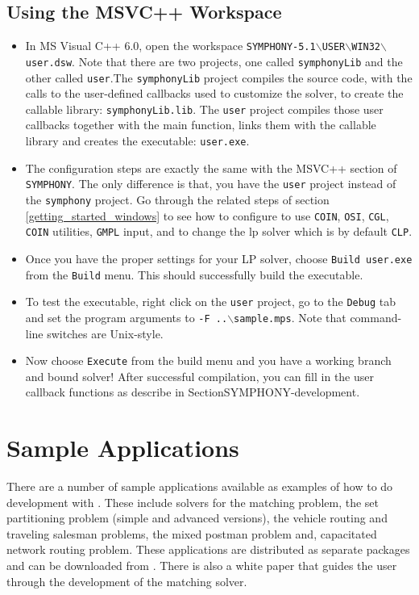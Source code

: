 \subsection{Using the MSVC++ Workspace}

\begin{itemize}
\item
In MS Visual C++ 6.0, open the workspace 
\texttt{SYMPHONY-5.1$\backslash$USER$\backslash$WIN32$\backslash$user.dsw}.
Note that there are two projects, one called \texttt{symphonyLib} and the other 
called \texttt{user}.The \texttt{symphonyLib} project compiles the source code, with the 
calls to the user-defined callbacks used to customize the solver, to create 
the callable library: \texttt{symphonyLib.lib}. The \texttt{user} 
project compiles those user callbacks together with the main function, links 
them with the callable library and creates the executable: \texttt{user.exe}.

\item 
The configuration steps are exactly the same with the MSVC++ section of 
\texttt{SYMPHONY}. The only 
difference is that, you have the \texttt{user} project instead of the
\texttt{symphony} project. Go through the related steps of section 
\ref{getting_started_windows} to see how to configure to use 
\texttt{COIN}, \texttt{OSI}, \texttt{CGL}, \texttt{COIN} utilities, 
\texttt{GMPL} input, and to change the lp solver which is by default 
\texttt{CLP}.

\item
Once you have the proper settings for your LP solver, choose \texttt{Build
user.exe} from the \texttt{Build} menu. This should successfully 
build the executable.

\item
To test the executable, right click on the \texttt{user} project, go to the
\texttt{Debug} tab and set the program arguments to 
\texttt{-F ..$\backslash$sample.mps}. Note that command-line switches are 
Unix-style.

\item
Now choose \texttt{Execute} from the build menu and you have a working branch
and bound solver! After successful compilation, you can fill in the user
callback functions as describe in Section{SYMPHONY-development}.
\end{itemize}

\section{Sample Applications}

There are a number of sample applications available as examples of how to do
development with \BB. These include solvers for the matching problem, the set
partitioning problem (simple and advanced versions), the vehicle routing and
traveling salesman problems, the mixed postman problem and, capacitated
network routing problem. These applications are distributed as separate
packages and can be downloaded from
\texttt{}. There is also a white paper that guides the
user through the development of the matching solver.
